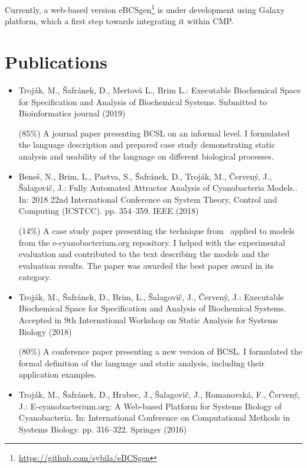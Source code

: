 \documentclass[11pt,a4paper]{report}
\begin{document}
Currently, a web-based version eBCSgen\footnote{\href{https://github.com/sybila/eBCSgen}{https://github.com/sybila/eBCSgen}} is under development using Galaxy platform, which a first step towards integrating it within CMP.

\chapter{Publications}

\begin{itemize}

\item Troják, M., Šafránek, D., Mertová L., Brim L.: Executable Biochemical Space for Specification and Analysis of Biochemical Systems. Submitted to Bioinformatics journal (2019)

(85\%) A journal paper presenting BCSL on an informal level. I formulated the language description and prepared case study demonstrating static analysis and usability of the language on different biological processes.

\item Beneš, N., Brim, L., Pastva, S., Šafránek, D., Troják, M., Červený, J., Šalagovič, J.: Fully Automated Attractor Analysis of Cyanobacteria Models.. In: 2018 22nd International Conference on System Theory, Control and Computing (ICSTCC). pp. 354--359. IEEE (2018)

(14\%) A case study paper presenting the technique from~\cite{barnat2017detecting} applied to models from the e-cyanobacterium.org repository. I helped with the experimental evaluation and contributed to the text describing the models and the
evaluation results. The paper was awarded the best paper award in its category.

\item Troják, M., Šafránek, D., Brim, L., Šalagovič, J., Červený, J.: Executable Biochemical Space for Specification and Analysis of Biochemical Systems. Accepted in 9th International Workshop on Static Analysis for Systems Biology (2018)

(80\%) A conference paper presenting a new version of BCSL. I formulated the formal definition of the language and static analysis, including their application examples.

\item Troják, M., Šafránek, D., Hrabec, J., Šalagovič, J., Romanovská, F., Červený, J.: E-cyanobacterium.org: A Web-based Platform for Systems Biology of Cyanobacteria. In: International Conference on Computational Methods in Systems Biology. pp. 316--322. Springer (2016)


\end{itemize}
\end{document}
